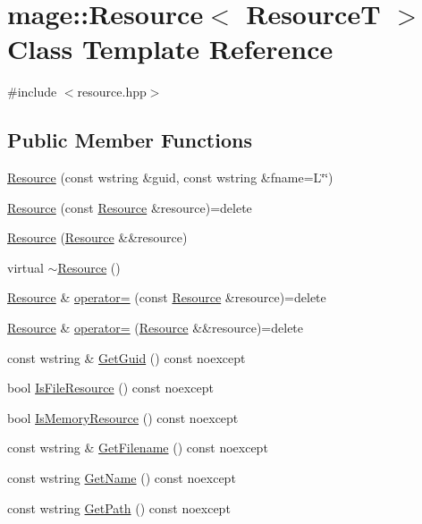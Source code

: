 \hypertarget{classmage_1_1_resource}{}\section{mage\+:\+:Resource$<$ ResourceT $>$ Class Template Reference}
\label{classmage_1_1_resource}


{\ttfamily \#include $<$resource.\+hpp$>$}

\subsection*{Public Member Functions}
\begin{DoxyCompactItemize}
\item 
\hyperlink{classmage_1_1_resource_ab8f31477e9e71a9c9d1be1f1c91ede20}{Resource} (const wstring \&guid, const wstring \&fname=L\char`\"{}\char`\"{})
\item 
\hyperlink{classmage_1_1_resource_a53da586d9bae285ab50c4cca2421a9ce}{Resource} (const \hyperlink{classmage_1_1_resource}{Resource} \&resource)=delete
\item 
\hyperlink{classmage_1_1_resource_a86216fd0f8072285ad1582e296a8a3fc}{Resource} (\hyperlink{classmage_1_1_resource}{Resource} \&\&resource)
\item 
virtual \hyperlink{classmage_1_1_resource_a56a3ac799224e100b271b65ec455b59e}{$\sim$\+Resource} ()
\item 
\hyperlink{classmage_1_1_resource}{Resource} \& \hyperlink{classmage_1_1_resource_a938159cb02ec565b9b957f993db4769d}{operator=} (const \hyperlink{classmage_1_1_resource}{Resource} \&resource)=delete
\item 
\hyperlink{classmage_1_1_resource}{Resource} \& \hyperlink{classmage_1_1_resource_aff0080e944136b1b0e889d4dd6cfb11f}{operator=} (\hyperlink{classmage_1_1_resource}{Resource} \&\&resource)=delete
\item 
const wstring \& \hyperlink{classmage_1_1_resource_adaa2464cb1fdb51a3f6028c0f316d083}{Get\+Guid} () const noexcept
\item 
bool \hyperlink{classmage_1_1_resource_a5995b6f8a2b0193a50255d082ae56af8}{Is\+File\+Resource} () const noexcept
\item 
bool \hyperlink{classmage_1_1_resource_af7b0f0c75c9bac9b7b0dc3daec832cbd}{Is\+Memory\+Resource} () const noexcept
\item 
const wstring \& \hyperlink{classmage_1_1_resource_a21bed60ba52a741eaffddc953f241be7}{Get\+Filename} () const noexcept
\item 
const wstring \hyperlink{classmage_1_1_resource_a7e056c97f70a3f7211d9456bbda51010}{Get\+Name} () const noexcept
\item 
const wstring \hyperlink{classmage_1_1_resource_a9df55cc00e0412b1435538e8107ee563}{Get\+Path} () const noexcept
\end{DoxyCompactItemize}
